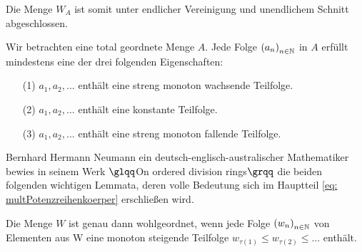 %
Die Menge $W_A$ ist somit unter endlicher Vereinigung und unendlichem Schnitt abgeschlossen.
\begin{lemma}\label{unendlicheFolgeEigenschaften}
Wir betrachten eine total geordnete Menge $A$. Jede Folge $\left(a_n\right)_{n \in \mathbb{N}}$ in $A$ erfüllt mindestens eine der drei folgenden Eigenschaften:
\begin{enumerate}
\item[(1)] $a_1, a_2, ...$ enthält eine streng monoton wachsende Teilfolge.
\item[(2)] $a_1, a_2, ...$ enthält eine konstante Teilfolge.
\item[(3)] $a_1, a_2, ...$ enthält eine streng monoton fallende Teilfolge.
\end{enumerate}
%
\end{lemma}
%
Bernhard Hermann Neumann ein deutsch-englisch-australischer Mathematiker bewies in seinem Werk $\glqq$On ordered division rings$\grqq$ \cite[S. 206]{neumann49} die beiden folgenden wichtigen Lemmata, deren volle Bedeutung sich im Hauptteil \ref{eq: multPotenzreihenkoerper} erschließen wird. 
\begin{lemma}\label{wohlgeordnetwennkeineabfallendeFolge} %
Die Menge $W$ ist genau dann wohlgeordnet, wenn jede Folge $\left(w_n\right)_{n\in\mathbb{N}}$ von Elementen aus W eine monoton steigende Teilfolge  $w_{\tau(1)} \le w_{\tau(2)} \le ...$ enthält.
\end{lemma}
